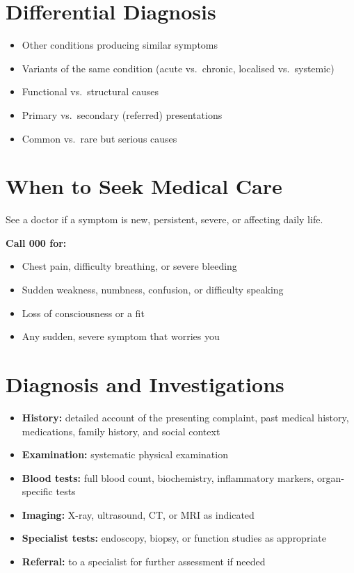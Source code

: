 \section*{Differential Diagnosis}
\begin{itemize}
    \item Other conditions producing similar symptoms
    \item Variants of the same condition (acute vs.\ chronic, localised vs.\ systemic)
    \item Functional vs.\ structural causes
    \item Primary vs.\ secondary (referred) presentations
    \item Common vs.\ rare but serious causes
\end{itemize}

\section*{When to Seek Medical Care}
See a doctor if a symptom is new, persistent, severe, or affecting daily life.

\textbf{Call 000 for:}
\begin{itemize}
    \item Chest pain, difficulty breathing, or severe bleeding
    \item Sudden weakness, numbness, confusion, or difficulty speaking
    \item Loss of consciousness or a fit
    \item Any sudden, severe symptom that worries you
\end{itemize}

\section*{Diagnosis and Investigations}
\begin{itemize}
    \item \textbf{History:} detailed account of the presenting complaint, past medical history, medications, family history, and social context
    \item \textbf{Examination:} systematic physical examination
    \item \textbf{Blood tests:} full blood count, biochemistry, inflammatory markers, organ-specific tests
    \item \textbf{Imaging:} X-ray, ultrasound, CT, or MRI as indicated
    \item \textbf{Specialist tests:} endoscopy, biopsy, or function studies as appropriate
    \item \textbf{Referral:} to a specialist for further assessment if needed
\end{itemize}

